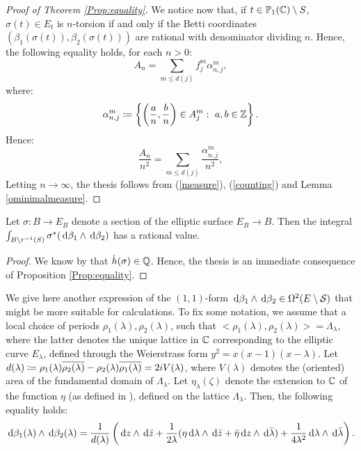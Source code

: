 \documentclass[a4paper,12pt]{article}
\begin{document}
\begin{proof}[Proof of Theorem \ref{Prop:equality}]
	We notice now that, if $t \in \mathbb{P}_1(\mathbb C)\setminus S$, $\sigma(t) \in E_t$ is $n$-torsion if and only if the Betti coordinates $(\beta_1(\sigma(t)),\beta_2(\sigma(t)))$ are rational with denominator dividing $n$. Hence, the following equality holds, for each $n>0$:
	\begin{equation}\label{counting}
		A_n=\sum_{m \leq d(j)}f_{j}^m\alpha_{n,j}^m,
	\end{equation}
	where:
	\[
	\alpha_{n,j}^m\coloneqq \left\{\left(\frac{a}{n},\frac{b}{n}\right)\in A_j^m: \ a,b \in \mathbb Z\right\}.
	\]
	Hence:
	\[
		\frac{A_n}{n^2}=\sum_{m \leq d(j)}\frac{\alpha_{n,j}^m}{n^2},
	\]
	Letting $n \to \infty$, the thesis follows from (\ref{measure}), (\ref{counting}) and Lemma \ref{ominimalmeasure}.
\end{proof}


\begin{corollary}
	Let $\sigma:B \rightarrow E_B$ denote a section of the elliptic surface $E_B \rightarrow B$. Then the integral $\int_{B \setminus r^{-1}(S)} \sigma^*(\,\mathrm d \beta_1 \wedge \,\mathrm d \beta_2)$ has a rational value.
\end{corollary}
\begin{proof}
	We know by \cite[Section 11.8]{ellipticsurfaces} that $\hat{h}(\sigma) \in \mathbb Q$. Hence, the thesis is an immediate consequence of Proposition \ref{Prop:equality}.
\end{proof}

We give here another expression of the $(1,1)$-form $\,\mathrm d \beta_1 \wedge \,\mathrm d \beta_2 \in \Omega^2(E \setminus \mathcal{S})$ that might be more suitable for calculations. To fix some notation, we assume that a local choice of periods $\rho_1(\lambda),\rho_2(\lambda)$, such that $<\rho_1(\lambda),\rho_2(\lambda)>=\Lambda_{\lambda}$, where the latter denotes the unique lattice in $\mathbb C$ corresponding to the elliptic curve $E_{\lambda}$, defined through the Weierstrass form $y^2=x(x-1)(x-\lambda)$. Let $d(\lambda)\coloneqq\rho_1(\lambda)\overline{\rho_2(\lambda)}-\rho_2(\lambda)\overline{\rho_1(\lambda)}=2iV(\lambda)$, where $V(\lambda)$ denotes the (oriented) area of the fundamental domain of $\Lambda_{\lambda}$. Let $\eta_{\lambda}(\zeta)$ denote the extension to $\mathbb C$ of the function $\eta$ (as defined in \cite[VI.3.1]{silverman1994advanced}), defined on the lattice $\Lambda_{\lambda}$. Then, the following equality holds:
\begin{equation}\label{riscrittura}
	\,\mathrm d \beta_1(\lambda) \wedge \,\mathrm d \beta_2(\lambda)=\frac{1}{d(\lambda)}\left(\,\mathrm d z \wedge \,\mathrm d \bar{z}+\frac{1}{2\lambda}(\eta \,\mathrm d \lambda \wedge \,\mathrm d \bar{z}+\bar{\eta}\,\mathrm d{z}\wedge\,\mathrm d{\bar{\lambda}})+\frac{1}{4\lambda^2}\,\mathrm d \lambda \wedge \,\mathrm d \bar{\lambda}\right).
\end{equation}
\end{document}

